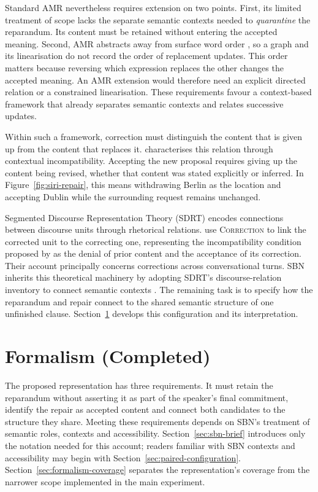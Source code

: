 \documentclass{article}
\begin{document}
Standard AMR nevertheless requires extension on two points. First, its
limited treatment of scope \citep{bosSquibExpressivePower2016} lacks the
separate semantic contexts needed to \emph{quarantine} the reparandum.
Its content must be retained without entering the accepted meaning. Second,
AMR abstracts away from surface word order
\citep{banarescuAbstractMeaningRepresentation2013}, so a graph and its
linearisation do not record the order of replacement updates. This order matters
because reversing which expression replaces the other changes the accepted
meaning. An AMR extension would therefore need an explicit directed relation
or a constrained linearisation. These requirements favour a context-based
framework that already separates semantic contexts and relates successive
updates.

Within such a framework, correction must distinguish the content that is
given up from the content that replaces it.
\citet{vanleusenIncompatibilityContextDiagnosis2004} characterises this
relation through contextual incompatibility. Accepting the new proposal
requires giving up the content being revised, whether that content was stated
explicitly or inferred. In Figure~\ref{fig:siri-repair}, this means withdrawing
Berlin as the location and accepting Dublin while the surrounding request
remains unchanged.

Segmented Discourse Representation Theory (SDRT)
\citep{asherLogicsConversation2003} encodes connections between discourse
units through rhetorical relations. \citet{lascaridesAgreementDisputesCommitments2009}
use \textsc{Correction} to link the corrected unit to the correcting one,
representing the incompatibility condition proposed by
\citet{vanleusenIncompatibilityContextDiagnosis2004} as the denial of prior
content and the acceptance of its correction. Their account principally concerns
corrections across conversational turns. SBN inherits this theoretical
machinery by adopting SDRT's discourse-relation inventory to connect semantic
contexts \citep{bosSequenceNotationCatching2023}. The remaining task is to
specify how the reparandum and repair connect to the shared semantic structure
of one unfinished clause. Section~\ref{sec:formalism} develops this
configuration and its interpretation.

\section{Formalism (Completed)}
\label{sec:formalism}
The proposed representation has three requirements. It must retain the
reparandum without asserting it as part of the speaker's final commitment,
identify the repair as accepted content and connect both candidates to the
structure they share. Meeting these requirements depends on SBN's treatment of
semantic roles, contexts and accessibility. Section~\ref{sec:sbn-brief}
introduces only the notation needed for this account; readers familiar with
SBN contexts and accessibility may begin with
Section~\ref{sec:paired-configuration}. Section~\ref{sec:formalism-coverage}
separates the representation's coverage from the narrower scope implemented
in the main experiment.
\end{document}
